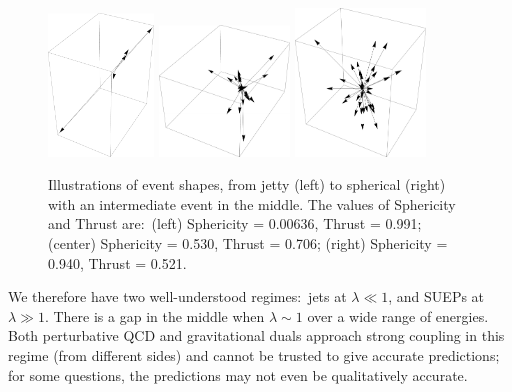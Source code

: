 \begin{enumerate}
\begin{figure}[t]\centering
\includegraphics[width=0.25\textwidth]{figures/DS_KKexample_event1.pdf}
\includegraphics[width=0.31\textwidth]{figures/DS_KKexample_event2.pdf}
\includegraphics[width=0.31\textwidth]{figures/DS_KKexample_event3.pdf}
\caption{Illustrations of event shapes, from jetty (left) to spherical (right) with an intermediate event in the middle. The values of Sphericity and Thrust are:~(left) Sphericity = 0.00636, Thrust = 0.991; (center) Sphericity = 0.530, Thrust = 0.706; (right)  Sphericity = 0.940, Thrust = 0.521. \label{fig:eventshapes}}
\end{figure}


We therefore have two well-understood regimes:~jets at $\lambda \ll 1$, and SUEPs at $\lambda \gg 1$. There is a gap in the middle when $\lambda \sim 1$ over a wide range of energies. Both perturbative QCD and gravitational duals approach strong coupling in this regime (from different sides) and cannot be trusted to give accurate predictions; for some questions, the predictions may not even be qualitatively accurate.


\end{enumerate}
